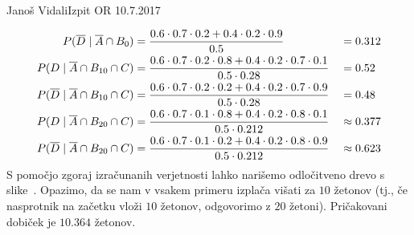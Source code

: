 \begin{naloga}{Janoš Vidali}{Izpit OR 10.7.2017}
\begin{odgovor}
\begin{alignat*}{2}
P(\overline{D} \;|\; \overline{A} \cap B_0)
&= {0.6 \cdot 0.7 \cdot 0.2 + 0.4 \cdot 0.2 \cdot 0.9 \over 0.5} &&= 0.312 \\
P(D \;|\; \overline{A} \cap B_{10} \cap C)
&= {0.6 \cdot 0.7 \cdot 0.2 \cdot 0.8 + 0.4 \cdot 0.2 \cdot 0.7 \cdot 0.1
\over 0.5 \cdot 0.28} &&= 0.52 \\
P(\overline{D} \;|\; \overline{A} \cap B_{10} \cap C)
&= {0.6 \cdot 0.7 \cdot 0.2 \cdot 0.2 + 0.4 \cdot 0.2 \cdot 0.7 \cdot 0.9
\over 0.5 \cdot 0.28} &&= 0.48 \\
P(D \;|\; \overline{A} \cap B_{20} \cap C)
&= {0.6 \cdot 0.7 \cdot 0.1 \cdot 0.8 + 0.4 \cdot 0.2 \cdot 0.8 \cdot 0.1
\over 0.5 \cdot 0.212} &&\approx 0.377 \\
P(\overline{D} \;|\; \overline{A} \cap B_{20} \cap C)
&= {0.6 \cdot 0.7 \cdot 0.1 \cdot 0.2 + 0.4 \cdot 0.2 \cdot 0.8 \cdot 0.9
\over 0.5 \cdot 0.212} &&\approx 0.623
\end{alignat*}
S pomočjo zgoraj izračunanih verjetnosti
lahko narišemo odločitveno drevo s slike~\fig.
Opazimo, da se nam v vsakem primeru izplača višati za $10$ žetonov
(tj., če nasprotnik na začetku vloži $10$ žetonov,
odgovorimo z $20$ žetoni).
Pričakovani dobiček je $10.364$ žetonov.

\begin{slika}
\makebox[\textwidth][c]{
\pgfslika
}
\end{slika}
\end{odgovor}
\end{naloga}
